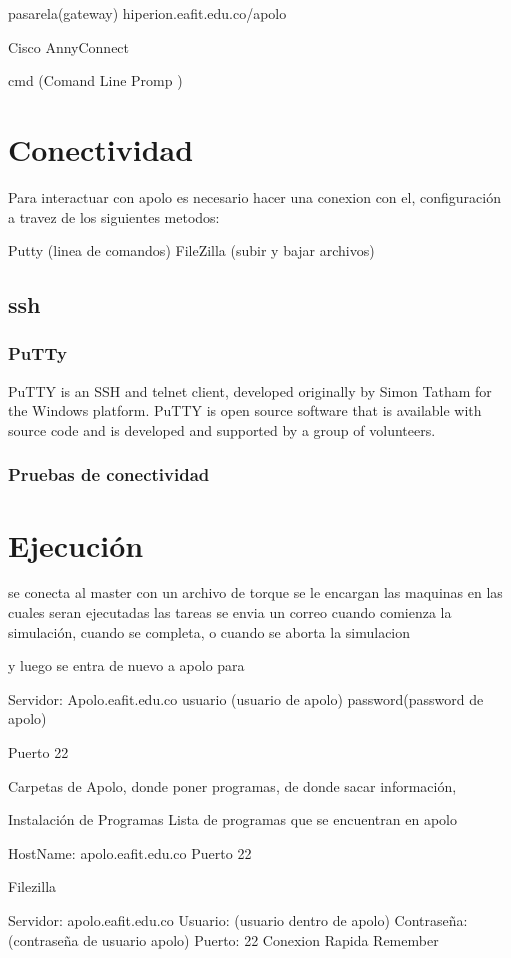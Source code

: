 pasarela(gateway) hiperion.eafit.edu.co/apolo

Cisco AnnyConnect

cmd  (Comand Line Promp )


\section{Conectividad}

Para interactuar con apolo es necesario hacer una conexion con el, configuración  a travez de los siguientes metodos: 


Putty  (linea de comandos)
FileZilla   (subir y bajar archivos)


\subsection{ssh}

\subsubsection{PuTTy}
PuTTY is an SSH and telnet client, developed originally by Simon Tatham for the Windows platform. PuTTY is open source software that is available with source code and is developed and supported by a group of volunteers.

\subsubsection{Pruebas de conectividad}

\section{Ejecución}


se conecta al master con un archivo de torque se le encargan las maquinas en las cuales seran ejecutadas las tareas
se envia un correo cuando comienza la simulación, cuando se completa, o cuando se aborta la simulacion

y luego se entra de nuevo a apolo para 



Servidor: Apolo.eafit.edu.co
usuario (usuario de apolo)
password(password de apolo)

Puerto 22



Carpetas de Apolo, donde poner programas, de donde sacar información,  

Instalación de Programas
Lista de programas que se encuentran en apolo



HostName: apolo.eafit.edu.co
Puerto 22


Filezilla

Servidor: apolo.eafit.edu.co
Usuario: (usuario dentro de apolo)  
Contraseña: (contraseña de usuario apolo)
Puerto: 22
Conexion Rapida
Remember